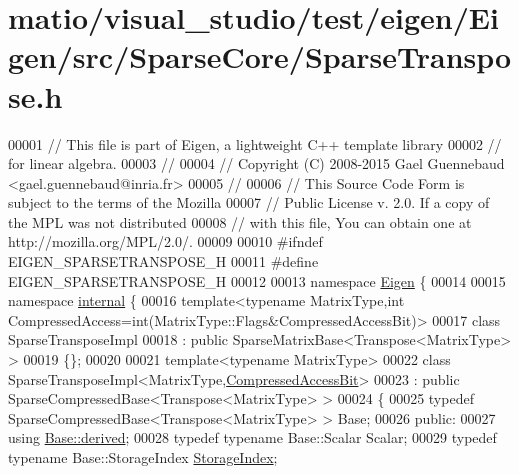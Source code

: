 \hypertarget{matio_2visual__studio_2test_2eigen_2_eigen_2src_2_sparse_core_2_sparse_transpose_8h_source}{}\section{matio/visual\+\_\+studio/test/eigen/\+Eigen/src/\+Sparse\+Core/\+Sparse\+Transpose.h}
\label{matio_2visual__studio_2test_2eigen_2_eigen_2src_2_sparse_core_2_sparse_transpose_8h_source}

\begin{DoxyCode}
00001 \textcolor{comment}{// This file is part of Eigen, a lightweight C++ template library}
00002 \textcolor{comment}{// for linear algebra.}
00003 \textcolor{comment}{//}
00004 \textcolor{comment}{// Copyright (C) 2008-2015 Gael Guennebaud <gael.guennebaud@inria.fr>}
00005 \textcolor{comment}{//}
00006 \textcolor{comment}{// This Source Code Form is subject to the terms of the Mozilla}
00007 \textcolor{comment}{// Public License v. 2.0. If a copy of the MPL was not distributed}
00008 \textcolor{comment}{// with this file, You can obtain one at http://mozilla.org/MPL/2.0/.}
00009 
00010 \textcolor{preprocessor}{#ifndef EIGEN\_SPARSETRANSPOSE\_H}
00011 \textcolor{preprocessor}{#define EIGEN\_SPARSETRANSPOSE\_H}
00012 
00013 \textcolor{keyword}{namespace }\hyperlink{namespace_eigen}{Eigen} \{ 
00014 
00015 \textcolor{keyword}{namespace }\hyperlink{namespaceinternal}{internal} \{
00016   \textcolor{keyword}{template}<\textcolor{keyword}{typename} MatrixType,\textcolor{keywordtype}{int} CompressedAccess=\textcolor{keywordtype}{int}(MatrixType::Flags&CompressedAccessBit)>
00017   \textcolor{keyword}{class }SparseTransposeImpl
00018     : \textcolor{keyword}{public} SparseMatrixBase<Transpose<MatrixType> >
00019   \{\};
00020   
00021   \textcolor{keyword}{template}<\textcolor{keyword}{typename} MatrixType>
00022   \textcolor{keyword}{class }SparseTransposeImpl<MatrixType,\hyperlink{group__flags_gaed0244284da47a2b8661261431173caf}{CompressedAccessBit}>
00023     : \textcolor{keyword}{public} SparseCompressedBase<Transpose<MatrixType> >
00024   \{
00025     \textcolor{keyword}{typedef} SparseCompressedBase<Transpose<MatrixType> > Base;
00026   \textcolor{keyword}{public}:
00027     \textcolor{keyword}{using} \hyperlink{group___core___module_a324b16961a11d2ecfd2d1b7dd7946545}{Base::derived};
00028     \textcolor{keyword}{typedef} \textcolor{keyword}{typename} Base::Scalar Scalar;
00029     \textcolor{keyword}{typedef} \textcolor{keyword}{typename} Base::StorageIndex \hyperlink{group___sparse_core___module_a0b540ba724726ebe953f8c0df06081ed}{StorageIndex};

\end{DoxyCode}
